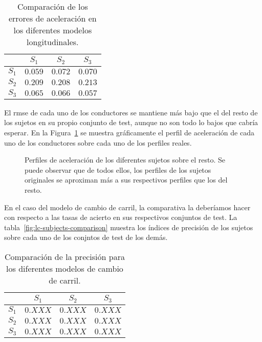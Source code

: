 \begin{table}[]
	\centering
	\caption[Comparación de los errores de aceleración en los diferentes modelos longitudinales]{Comparación de los errores de aceleración en los diferentes modelos longitudinales. }
	\label{tbl:lm-subjects-comparison}
	\begin{tabular}{c|ccc}
		& \textbf{$S_1$} & \textbf{$S_2$} & \textbf{$S_3$} \\ \hline
		\textbf{$S_1$} & $0.059$ & $0.072$ & $0.070$ \\
		\textbf{$S_2$} & $0.209$ & $0.208$ & $0.213$ \\
		\textbf{$S_3$} & $0.065$ & $0.066$ & $0.057$ \\ \hline
	\end{tabular}
\end{table}

El \ac{rmse} de cada uno de los conductores se mantiene más bajo que el del resto de los sujetos en su propio conjunto de test, aunque no son todo lo bajos que cabría esperar. En la Figura~\ref{fig:lm-subjects-comparison} se muestra gráficamente el perfil de aceleración de cada uno de los conductores sobre cada uno de los perfiles reales.

\begin{figure}[t]
	\centering
	\qquad
	\qquad
	\caption[Perfiles de aceleración de los diferentes sujetos sobre el resto]{Perfiles de aceleración de los diferentes sujetos sobre el resto. Se puede observar que de todos ellos, los perfiles de los sujetos originales se aproximan más a sus respectivos perfiles que los del resto.}
	\label{fig:lm-subjects-comparison}
\end{figure}

En el caso del modelo de cambio de carril, la comparativa la deberíamos hacer con respecto a las tasas de acierto en sus respectivos conjuntos de test. La tabla~\ref{fig:lc-subjects-comparison} muestra los índices de precisión de los sujetos sobre cada uno de los conjntos de test de los demás.

\begin{table}[]
	\centering
	\caption[Comparación de la precisión para los diferentes modelos de cambio de carril]{Comparación de la precisión para los diferentes modelos de cambio de carril.}
	\label{tbl:lc-subjects-comparison}
	\begin{tabular}{c|ccc}
		& \textbf{$S_1$} & \textbf{$S_2$} & \textbf{$S_3$} \\ \hline
		\textbf{$S_1$} & $0.XXX$ & $0.XXX$ & $0.XXX$ \\
		\textbf{$S_2$} & $0.XXX$ & $0.XXX$ & $0.XXX$ \\
		\textbf{$S_3$} & $0.XXX$ & $0.XXX$ & $0.XXX$ \\ \hline
	\end{tabular}
\end{table}


